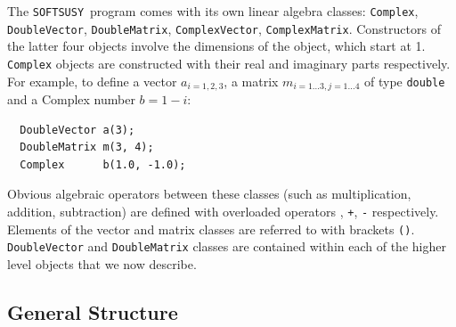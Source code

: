 \documentclass{article}
\def\SOFTSUSY{{\tt SOFTSUSY}}
\def\code#1{\small{\tt #1}\normalsize}
\begin{document}
The \SOFTSUSY~program comes with its own linear algebra classes: 
\code{Complex}, \code{DoubleVector}, \code{DoubleMatrix},
\code{ComplexVector}, \code{ComplexMatrix}. 
Constructors of the latter four objects involve the dimensions of the object,
which start 
at 1. \code{Complex} objects are constructed with their real and imaginary
parts respectively.
For example, to define a vector $a_{i=1,2,3}$, a matrix $m_{i=1\ldots3,
j=1\ldots 4}$ of type \code{double} and a Complex number $b=1-i$:
\small
\begin{verbatim}
  DoubleVector a(3);
  DoubleMatrix m(3, 4);
  Complex      b(1.0, -1.0); 
\end{verbatim}
\normalsize
Obvious algebraic operators between these classes (such as
multiplication, addition, subtraction) are defined with overloaded
operators \code{*}, \code{+}, \code{-} respectively. Elements of the vector
and matrix classes are referred to with 
brackets \code{()}. \code{DoubleVector} and \code{DoubleMatrix} classes are
contained within each of the higher level objects that we now describe. 

\subsection{General Structure}
\end{document}
